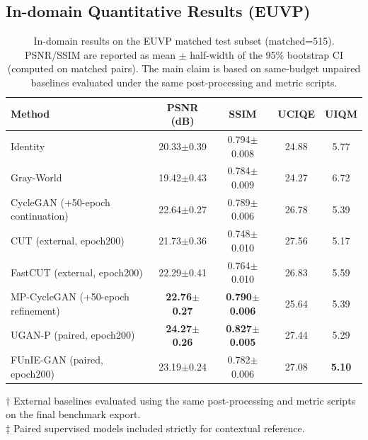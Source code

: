 \documentclass[final,1p,times]{elsarticle}
\begin{document}
\subsection{In-domain Quantitative Results (EUVP)}
\begin{table}[!t]
\centering
\caption{In-domain results on the EUVP matched test subset (matched=515). PSNR/SSIM are reported as mean $\pm$ half-width of the 95\% bootstrap CI (computed on matched pairs). The main claim is based on same-budget unpaired baselines evaluated under the same post-processing and metric scripts.}
\begin{tabular}{lcccc}
\toprule
Method & PSNR (dB) & SSIM & UCIQE & UIQM \\
\midrule
Identity & 20.33$\pm$0.39 & 0.794$\pm$0.008 & 24.88 & 5.77 \\
Gray-World & 19.42$\pm$0.43 & 0.784$\pm$0.009 & 24.27 & 6.72 \\
CycleGAN (+50-epoch continuation) & 22.64$\pm$0.27 & 0.789$\pm$0.006 & 26.78 & 5.39 \\
CUT (external, epoch200) & 21.73$\pm$0.36 & 0.748$\pm$0.010 & 27.56 & 5.17 \\
FastCUT (external, epoch200) & 22.29$\pm$0.41 & 0.764$\pm$0.010 & 26.83 & 5.59 \\
MP-CycleGAN (+50-epoch refinement) & \textbf{22.76$\pm$0.27} & \textbf{0.790$\pm$0.006} & 25.64 & 5.39 \\
\midrule
UGAN-P (paired, epoch200) & \textbf{24.27$\pm$0.26} & \textbf{0.827$\pm$0.005} & 27.44 & 5.29 \\
FUnIE-GAN (paired, epoch200) & 23.19$\pm$0.24 & 0.782$\pm$0.006 & 27.08 & \textbf{5.10} \\
\bottomrule
\end{tabular}
\vspace{2pt}

\footnotesize
$\dagger$ External baselines evaluated using the same post-processing and metric scripts on the final benchmark export.\\
$\ddagger$ Paired supervised models included strictly for contextual reference.
\end{table}
\end{document}
